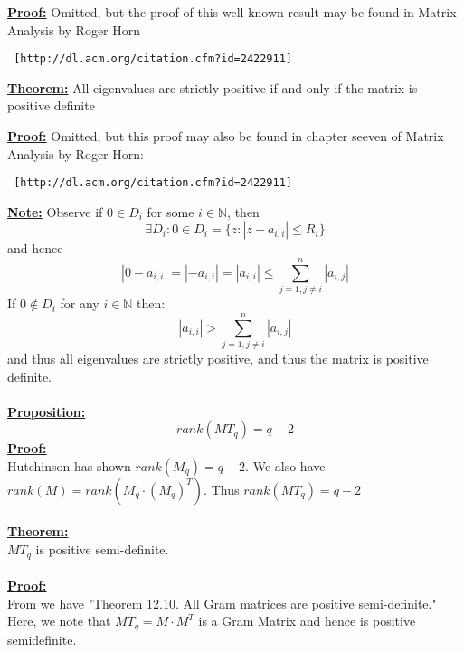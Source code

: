 \documentclass[11pt]{article}
\theoremstyle{plain}
\theoremstyle{definition}
\begin{document}
\textbf{\underline{Proof:}} Omitted, but the proof of this well-known result may be found in Matrix Analysis by Roger Horn
\begin{verbatim} [http://dl.acm.org/citation.cfm?id=2422911]
\end{verbatim}

\textbf{\underline{Theorem:}} All eigenvalues are strictly positive if and only if the matrix is positive definite

\textbf{\underline{Proof:}} Omitted, but this proof may also be found in chapter seeven of Matrix Analysis by Roger Horn: 
\begin{verbatim} [http://dl.acm.org/citation.cfm?id=2422911]
\end{verbatim}

\textbf{\underline{Note:}} Observe if $0 \in D_i$ for some $i \in \mathbb{N}$, then
\begin{equation*}
\exists D_i : 0 \in D_i = \{ z: |z-a_{i,i}| \leq R_i\}
\end{equation*}
and hence
\begin{equation*}
|0-a_{i,i}| = |-a_{i,i}| = |a_{i,i}|    \leq \sum\limits_{j=1, j \neq i}^n |a_{i,j}|
\end{equation*}
If $0 \notin D_i$ for any $i \in \mathbb{N}$ then:
\begin{equation*}
|a_{i,i}|    > \sum\limits_{j=1, j \neq i}^n |a_{i,j}|
\end{equation*}
and thus all eigenvalues are strictly positive, and thus the matrix is positive definite.\\
\\
\textbf{\underline{Proposition:}} \\
\begin{equation*}
rank(MT_q) = q-2
\end{equation*}
\textbf{\underline{Proof:}} \\
Hutchinson \cite{1107.0264} has shown $rank(M_q) = q-2$. We also have $rank(M) = rank(M_q \cdot (M_q)^T)$. Thus $rank(MT_q) = q-2$\\
\\
\textbf{\underline{Theorem:}}\\ $MT_q$ is positive semi-definite.\\
\\
\textbf{\underline{Proof:}}\\
From \cite{NumAlys} we have "Theorem 12.10. All Gram matrices are positive semi-definite." Here, we note that $MT_q = M \cdot M^T$ is a Gram Matrix and hence is positive semidefinite.\\
\end{document}
